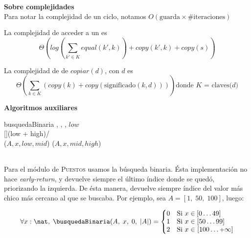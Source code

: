 \documentclass[10pt, a4paper]{article}
\begin{document}
{\large\bfseries Sobre complejidades}\\

Para notar la complejidad de un ciclo, notamos $O(\text{guarda} \times \text{\#iteraciones})$

La complejidad de acceder a un \diccLog[] es 
$$
    \Theta\left(log(\sum_{k'\in K}^{} equal(k',k)) + copy(k', k) + copy(s)\right)
$$

La complejidad de de $copiar(d)$, con \diccLog[] $d$ es 
$$
    \Theta\left( \sum_{k \in K} (copy(k) + copy(\text{significado}(k, d))) \right) \text{donde $K$ = claves($d$)}
$$


\vfill
{\color[RGB]{240 240, 240}\begin{center}
\end{center}}

\clearpage
{\large\bfseries Algoritmos auxiliares}\\

\begin{implementacion}%
    {busquedaBinaria}%
    {, %
     , %
     , %
     }{\nat}{}%
        \State \Return $low$%
    \EndIf%
    \\%
    [\nat]{(low + high)\;/}    %
    \\%
        \State \Return \busquedaBinaria($A, x, low, mid$) %
    \Else%
        \State \Return \busquedaBinaria($A, x, mid, high$) %
    \EndIf%
    \\%
    \\
\end{implementacion}%

Para el módulo de \textsc{Puestos} usamos la búsqueda binaria. Ésta implementación no hace \textit{early-return}, y devuelve siempre el último índice donde se quedó, priorizando la izquierda. De ésta manera, devuelve siempre índice del valor más chico más cercano al que se buscaba. Por ejemplo, sea $A = [1,\;50,\;100]$, luego: 

\begin{align*}
    \forall x: \nat,\; \busquedaBinaria(A,\;x,\;0,\;|A|) = \left\{\begin{matrix}
 0& \text{Si }x \in& \hspace{-10mm}\;[0 \dots 49]\\ 
 1& \text{Si }x \in& \hspace{-8mm}\;[50 \dots 99]\\
 2& \text{Si }x \in& \hspace{-3.4mm}\;[100 \dots {\text{\small +}}\infty]
\end{matrix}\right.
\end{align*}
\end{document}

